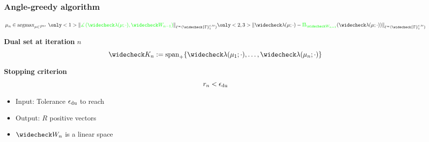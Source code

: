 \documentclass[a4paper,10pt]{beamer}
\newcommand\gr[1]{\textcolor{green} {#1} }
\newcommand\bl[1]{\textcolor{blue} {#1} }
\newcommand\ma[1]{\textcolor{royalmagenta} {#1} }
\begin{document}
 
\begin{frame}
 \frametitle{Angle-greedy algorithm}
\begin{center}
\begin{tcolorbox}[title = Selection criterion, halign title = center, colback=blue!5,colframe=black!50!cyan,width = .8\linewidth]
\vspace{-.4cm}$$\mu_n\in
{\mathrm{argmax}}_{\mu \in\mathcal P^{\mathrm{tr}}}\  
\only<1>{\|\gr{\measuredangle \left(\widecheck\lambda(\mu;\cdot),\widecheck W_{n-1}\right)}\|_{\ell^\infty(\widecheck{\Gamma}_{1}^{c,{\rm tr}})}}
\only<2,3>{\|\widecheck\lambda(\mu;\cdot)-\gr{\Pi_{\widecheck W_{n-1}}}(\widecheck\lambda(\mu;\cdot))\|_{\ell^\infty(\widecheck{\Gamma}_{1}^{c,{\rm tr}})}}$$
\end{tcolorbox}
\end{center}
\begin{center}
{\bfseries Dual set at iteration} $n$
\gr{$$\widecheck K_n := {\rm span}_+\{\widecheck\lambda(\mu_1;\cdot),\ldots,\widecheck\lambda(\mu_{n};\cdot)\}$$
}

{\bfseries Stopping criterion} 
\bl{$$r_n<\epsilon_{\rm du}$$}
\end{center}
\vspace{-.6cm}
  \begin{itemize}
\item Input: Tolerance \ma{$\epsilon_{\rm du}$}to reach \only<3>{{\Large\dSmiley}}
 \item Output: $R$ positive vectors
 \item $\widecheck W_n$ is a linear space \only<3>{{\Large\dSadey}}
\end{itemize}
\end{frame}
\end{document}
